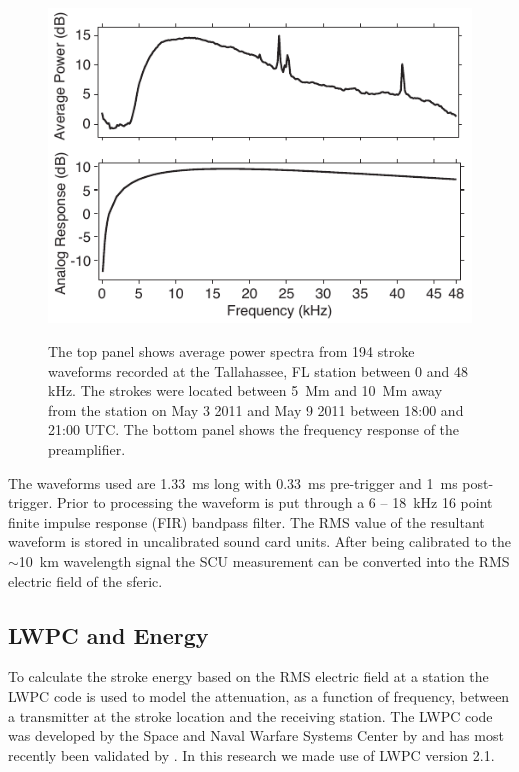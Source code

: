 \begin{figure}[ht!]
\centering
\includegraphics[scale=1]{energy/Figures/PPS_Spectra.pdf}\\
\caption{The top panel shows average power spectra from 194 stroke waveforms recorded at the Tallahassee, FL station between 0 and 48 kHz. The strokes were located between 5~Mm and 10~Mm away from the  station on May 3 2011 and May 9 2011 between 18:00 and 21:00 UTC. The bottom panel shows the frequency response of the preamplifier.}
\label{energy:fig:average_spectra}
\end{figure}

The waveforms used are 1.33~ms long with 0.33~ms pre-trigger and 1~ms post-trigger.
Prior to processing the waveform is put through a 6 -- 18~kHz 16 point finite impulse response (FIR) bandpass filter.
The RMS value of the resultant waveform is stored in uncalibrated sound card units.
After being calibrated to the $\sim$10~km wavelength signal the SCU measurement can be converted into the RMS electric field of the sferic. 

\subsection{LWPC and Energy}

To calculate the stroke energy based on the RMS electric field at a station the LWPC code is used to model the attenuation, as a function of frequency, between a transmitter at the stroke location and the receiving station.
The LWPC code was developed by the Space and Naval Warfare Systems Center by \citet{Ferguson1998} and has most recently been validated by \citet{Thomson2011}.
In this research we made use of LWPC version 2.1.

